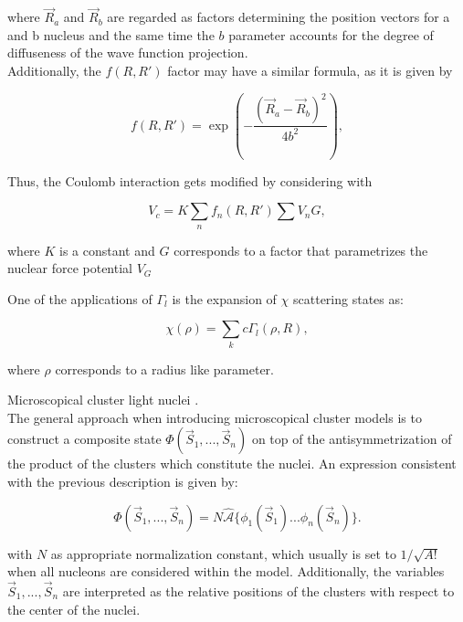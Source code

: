 \documentclass[openany]{book}
\begin{document}
where $\vec R_a$ and $\vec R_b$ are regarded as factors determining the position vectors for a and b nucleus and the same time the $b$ parameter accounts for the degree of diffuseness of the wave function projection. \\

Additionally, the $f(R, R')$ factor may have a similar formula, as it is given by

\begin{equation}\label{eq:micro_cluster_overlapping_f}
	f(R, R') = \exp {\left(-\frac{(\vec R_a - \vec R_b)^2}{4b^2}\right)},
\end{equation}

Thus, the Coulomb interaction gets modified by considering with 

\begin{equation}\label{eq:micro_cluster_overlapping_coulomb}
	V_c = K \sum_n f_n(R, R') \sum V_n G,
\end{equation}

where $K$ is a constant and $G$ corresponds to a factor that parametrizes the nuclear force potential $V_G$


One of the applications of $\Gamma_l$ is the expansion of $\chi $ scattering states as: 

 \begin{equation}\label{eq:micro_cluster_scattering}
	\chi(\rho) = \sum_{k} c \Gamma_l(\rho, R),
 \end{equation}

where $\rho$ corresponds to a radius like parameter.



Microscopical cluster light nuclei \cite{freer_horiuchi_kanada-enyo_lee_meisner_2018}. \\

The general approach when introducing microscopical cluster models is to construct a composite state $\Phi(\vec S_1, ..., \vec S_n)$ on top of the antisymmetrization of the product of the clusters which constitute the nuclei. An expression consistent with the previous description is given by:

\begin{equation}\label{eq:micro_cluster_generalizedWaveFunction}
\Phi(\vec S_1, ..., \vec S_n)  = N \hat {\mathcal {A}} \{ \phi_1 (\vec S_1) ...  \phi_n (\vec S_n)\}.
\end{equation}

with $N$ as appropriate normalization constant, which usually is set to $1/\sqrt{A!}$ when all nucleons are considered within the model. Additionally, the variables $\vec S_1, ..., \vec S_n$ are interpreted as the relative positions of the clusters with respect to the center of the nuclei.  \\
\end{document}
